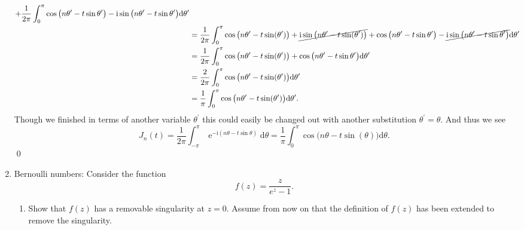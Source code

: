 \documentclass[10pt]{amsart}
\newcommand{\D}{\mathrm{d}}
\newcommand{\I}{\mathrm{i}}
\DeclareMathOperator{\E}{e}
\theoremstyle{nonumberplain}
\begin{document}
\begin{enumerate}[label={\bf {\arabic*}:}]
\begin{align*}
	+ \frac 1 {2 \pi }\int_{0}^{\pi} \cos \big(n\theta^\prime - t \sin \theta^\prime\big) - \I\sin\big( n\theta^\prime - t \sin \theta^\prime\big) \D \theta^\prime \\
	&= \frac 1 {2 \pi } \int_{0}^{\pi} \cos \big(n\theta^\prime - t \sin (\theta^\prime)\big) + \cancel{\I\sin \big(n\theta^\prime - t \sin (\theta^\prime)\big)}
	+ \cos \big(n\theta^\prime - t \sin \theta^\prime\big) - \cancel{\I\sin\big( n\theta^\prime - t \sin \theta^\prime\big)} \D \theta^\prime \\
	&= \frac 1 {2 \pi } \int_{0}^{\pi} \cos \big(n\theta^\prime - t \sin (\theta^\prime)\big) + \cos \big(n\theta^\prime - t \sin \theta^\prime\big) \D \theta^\prime \\
	&= \frac 2 {2 \pi } \int_{0}^{\pi} \cos \big(n\theta^\prime - t \sin (\theta^\prime)\big) \D \theta^\prime \\
	&= \frac 1 \pi \int_{0}^{\pi} \cos \big(n\theta^\prime - t \sin (\theta^\prime)\big) \D \theta^\prime.
\end{align*}
Though we finished in terms of another variable $\theta^\prime$ this could easily be changed out with another substitution $\theta^\prime = \theta$.
And thus we see
$$
J_n(t) = \frac 1 {2 \pi }\int_{-\pi}^{\pi} \E^{-\I(n\theta - t \sin \theta)} \D \theta = \frac 1 \pi \int_{0}^{\pi} \cos \big(n\theta - t \sin (\theta)\big) \D \theta.
$$
\qed \\
\newpage

\item Bernoulli numbers: Consider the function
$$
f(z)=\frac{z}{e^z-1} .
$$
\begin{enumerate}
\item Show that $f(z)$ has a removable singularity at $z=0$. Assume from now on that the definition of $f(z)$ has been extended to remove the singularity. \\


\end{enumerate}
\end{enumerate}
\end{document}
